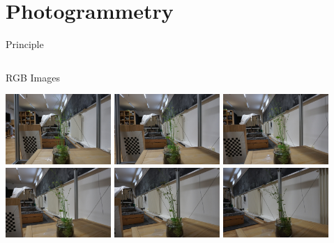 \documentclass[aspectratio=169]{beamer}
\begin{document}
\section{Photogrammetry}
\begin{frame}
    \tableofcontents[sectionstyle=show/shaded]
\end{frame}
\begin{frame}{Principle}
    \begin{columns}
        \begin{column}{0.45\textwidth}
            \centering
            RGB Images

            \includegraphics[width=0.3\textwidth]{images/rgb000.jpg}
            \includegraphics[width=0.3\textwidth]{images/rgb001.jpg}
            \includegraphics[width=0.3\textwidth]{images/rgb002.jpg}
            \includegraphics[width=0.3\textwidth]{images/rgb003.jpg}
            \includegraphics[width=0.3\textwidth]{images/rgb004.jpg}
            \includegraphics[width=0.3\textwidth]{images/rgb005.jpg}

\end{column}
\end{columns}
\end{frame}
\end{document}
